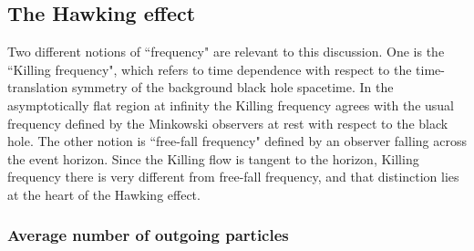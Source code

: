 \documentclass[12pt]{article}
\begin{document}
\subsection{The Hawking effect}

Two different 
notions of ``frequency" are relevant to this
discussion. One is the ``Killing frequency", which
refers to time dependence with respect to 
the time-translation symmetry of the background
black hole spacetime. In the asymptotically flat
region at infinity the Killing frequency agrees with 
the usual frequency defined by the Minkowski observers
at rest with respect to the black hole. The other 
notion is ``free-fall frequency" defined by an observer
falling across the event horizon. Since the Killing flow is
tangent to the horizon, Killing frequency
there is very different from free-fall frequency, and that
distinction lies at the heart of the Hawking effect.

\subsubsection{Average number of outgoing particles}
\end{document}

